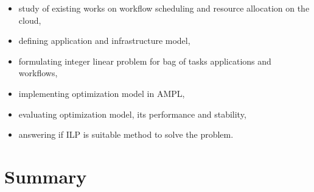 \begin{itemize}
  \item study of existing works on workflow scheduling and resource allocation on the cloud,
  \item defining application and infrastructure model,
  \item formulating integer linear problem for bag of tasks applications and workflows,
  \item implementing optimization model in AMPL,
  \item evaluating optimization model, its performance and stability,
  \item answering if ILP is suitable method to solve the problem.
\end{itemize}

\section{Summary}


